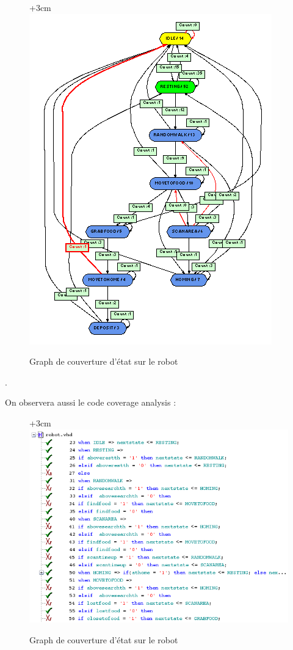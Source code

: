 \documentclass{article}
\begin{document}
\begin{figure}[!h]
\advance\leftskip+3cm
\includegraphics[scale=0.65]{PremiereAnalyse/graphRobot.PNG}
\caption{Graph de couverture d'état sur le robot}
\label{graphe-robot}
\end{figure}.



On observera aussi le code coverage analysis :

\begin{figure}[!h]
\advance\leftskip+3cm
\includegraphics[scale=0.7]{PremiereAnalyse/codeCov.PNG}
\caption{Graph de couverture d'état sur le robot}
\label{graphe-robot}
\end{figure}
\end{document}
